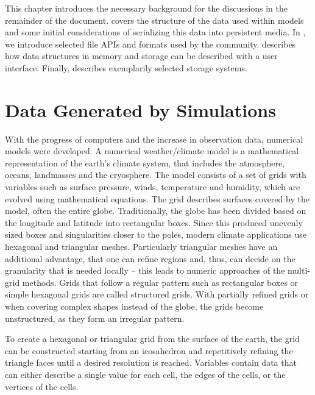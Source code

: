 \begin{chapterIntro}
This chapter introduces the necessary background for the discussions in the remainder of the document.
 covers the structure of the data used within models and some initial considerations of serializing this data into persistent media.
In , we introduce selected file APIs and formats used by the community.
 describes how data structures in memory and storage can be described with a user interface. %
Finally,  describes exemplarily selected storage systems.
\end{chapterIntro}


\section{Data Generated by Simulations}
\label{sec: Data Generated by Simulations}

With the progress of computers and the increase in observation data, numerical models were developed.
A numerical weather/climate model is a mathematical representation of the earth’s climate system, that includes the atmosphere, oceans, landmasses and the cryosphere.
The model consists of a set of grids with variables such as surface pressure, winds, temperature and humidity, which are evolved using mathematical equations.
The grid describes surfaces covered by the model,  often the entire globe.
Traditionally, the globe has been divided based on the longitude and latitude into rectangular boxes.
Since this produced unevenly sized boxes and singularities closer to the poles, modern climate applications use hexagonal and triangular meshes.
Particularly triangular meshes have an additional advantage, that one can refine regions and, thus, can decide on the granularity that is needed locally -- this leads to numeric approaches of the multi-grid methods.
Grids that follow a regular pattern such as rectangular boxes or simple hexagonal grids are called structured grids.
With partially refined grids or when covering complex shapes instead of the globe, the grids become unstructured, as they form an irregular pattern.

To create a hexagonal or triangular grid from the surface of the earth, the grid can be constructed starting from an icosahedron and repetitively refining the triangle faces until a desired resolution is reached.
Variables contain data that can either describe a single value for each cell, the edges of the cells, or the vertices of the cells.

